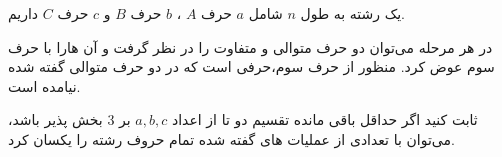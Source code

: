\begin{PROBLEM}
	\p
	یک رشته به طول
	$n$
	شامل 
	$a$
	حرف 
	$A$
	، 
	$b$
	حرف
	$B$
	و 
	$c$
	حرف
	$C$
	داریم.
	
	در هر مرحله می‌توان دو حرف متوالی و متفاوت را در نظر گرفت و آن هارا با حرف سوم عوض کرد. منظور از حرف سوم،‌حرفی
	است که در دو حرف متوالی گفته شده نیامده است.

	ثابت کنید اگر حداقل باقی مانده تقسیم دو تا از اعداد
	$a, b, c$
	بر 
	$3$
	بخش پذیر باشد، می‌توان با تعدادی از عملیات های گفته شده تمام حروف رشته را یکسان کرد.
	\SOLUTION{
		\p

	}
\end{PROBLEM}